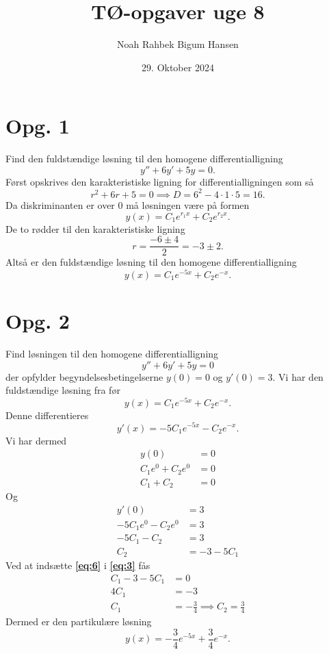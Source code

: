 \documentclass[12pt]{article}
\title{TØ-opgaver uge 8}
\author{Noah Rahbek Bigum Hansen}
\date{29. Oktober 2024}
\theoremstyle{definition}
\begin{document}
\maketitle

\section*{Opg. 1}
Find den fuldstændige løsning til den homogene differentialligning
\[
  y'' + 6y' + 5y = 0
.\]
\bigbreak
Først opskrives den karakteristiske ligning for differentialligningen som så
\[
r^2 + 6r + 5 = 0 \implies D = 6^2 - 4\cdot 1\cdot 5 = 16
.\]
Da diskriminanten er over 0 må løsningen være på formen
\[
y(x) = C_1e^{r_1x} + C_2e^{r_2x} 
.\]
De to rødder til den karakteristiske ligning
\[
r = \frac{-6 \pm 4}{2} = -3 \pm 2 
.\]
Altså er den fuldstændige løsning til den homogene differentialligning
\[
y(x) = C_1e^{-5x} + C_2e^{-x}  
.\]

\section*{Opg. 2}
Find løsningen til den homogene differentialligning
\[
y'' + 6y' + 5y = 0
\]
der opfylder begyndelsesbetingelserne $y(0) = 0$ og $y'(0) = 3$.
\bigbreak
Vi har den fuldstændige løsning fra før
\[
y(x) = C_1e^{-5x} + C_2e^{-x} 
.\]
Denne differentieres
\[
y'(x) = -5C_1e^{-5x} - C_2e^{-x} 
.\]
Vi har dermed
\begin{align}
y(0) &= 0 \\
C_1e^{0} + C_2e^{0} &= 0 \\
C_1 + C_2 &= 0 \label{eq:3}
\end{align}
Og
\begin{align}
y'(0) &= 3 \\
-5C_1e^{0} - C_2e^{0} &= 3 \\
-5C_1 - C_2 &= 3 \\
C_2 &= - 3 - 5C_1 \label{eq:6} 
\end{align}
Ved at indsætte \textbf{\autoref{eq:6}} i \textbf{\autoref{eq:3}} fås
\begin{align*}
C_1 - 3 - 5C_1 &= 0 \\
4C_1 &= -3 \\
C_1 &= -\frac{3}{4} \implies C_2 = \frac{3}{4}
\end{align*}
Dermed er den partikulære løsning
\[
y(x) = -\frac{3}{4}e^{-5x} + \frac{3}{4}e^{-x} 
.\]
\end{document}
